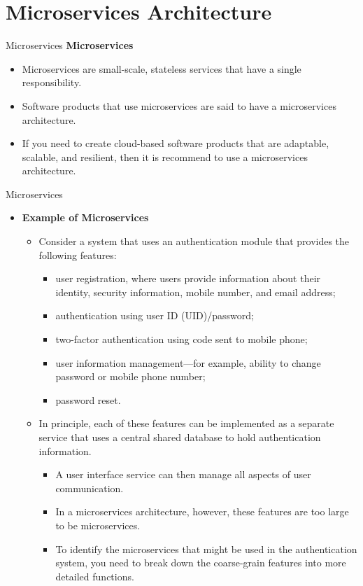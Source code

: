 \documentclass{beamer}
\begin{document}
\section{Microservices Architecture}
\begin{frame}{Microservices}
\textbf{Microservices}
\begin{itemize}
	\item Microservices are small-scale, stateless services that have a single responsibility.
	\item Software products that use microservices are said to have a microservices architecture.
	\item If you need to create cloud-based software products that are adaptable, scalable, and resilient, then it is recommend to use a microservices architecture.
\end{itemize}
\end{frame}
\begin{frame}{Microservices}
\begin{itemize}
	\item 	\textbf{Example of Microservices}
		\begin{itemize}
		\item Consider a system that uses an authentication module that provides the following features:
		\begin{itemize}
			\item user registration, where users provide information about their identity, security information, mobile number, and email address;
			\item authentication using user ID (UID)/password;
			\item two-factor authentication using code sent to mobile phone;
			\item user information management—for example, ability to change password or mobile phone number;
			\item password reset.
			
		\end{itemize}
		\item In principle, each of these features can be implemented as a separate service that uses a central shared database to hold authentication information. 
		\begin{itemize}
			\item A user interface service can then manage all aspects of user communication.
			\item In a microservices architecture, however, these features are too large to be microservices. 
			\item To identify the microservices that might be used in the authentication system, you need to break down the coarse-grain features into more detailed functions.
		\end{itemize}
	\end{itemize}
\end{itemize}
\end{frame}
\end{document}

